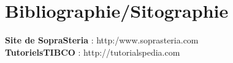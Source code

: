\section*{Bibliographie/Sitographie}
\tab[0.42cm] \textbf{Site de SopraSteria  }: http:/www.soprasteria.com\\
\tab \textbf{TutorielsTIBCO }: http://tutorialspedia.com\\
